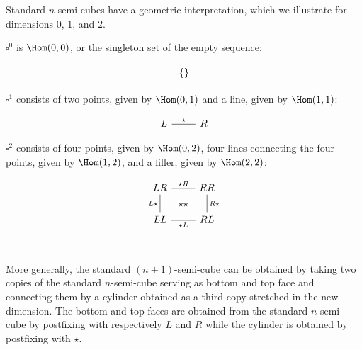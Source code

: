 \documentclass[10pt]{art.cls/art}
\newcommand{\Cube}{\ensuremath{\boldsymbol{\square}}}
\newcommand{\kstar}{{\star}}
\begin{document}
Standard $n$-semi-cubes have a geometric interpretation, which we illustrate for dimensions $0$, $1$, and $2$.

\begin{example}[$\Cube^0$]
  $\Cube^0$ is $\Hom(0, 0)$, or the singleton set of the empty sequence:

  \begin{equation*}
    \begin{tikzcd}
      \{\}
    \end{tikzcd}
  \end{equation*}
\end{example}

\begin{example}[$\Cube^1$]
  $\Cube^1$ consists of two points, given by $\Hom(0, 1)$ and a line, given by $\Hom(1, 1)$:

  \begin{equation*}
    \begin{tikzcd}
      L \arrow[r, "\kstar", dash] & R
    \end{tikzcd}
  \end{equation*}
\end{example}

\begin{example}[$\Cube^2$]
  $\Cube^2$ consists of four points, given by $\Hom(0, 2)$, four lines connecting the four points, given by $\Hom(1, 2)$, and a filler, given by $\Hom(2, 2)$:

  \begin{equation*}
    \begin{tikzcd}
      LR \arrow[r, dash, "\kstar R"{name=F}] \arrow[d, dash, "L\kstar" left] & RR \arrow[d, dash, "R\kstar"] \\
      LL \arrow[r, dash, "\kstar L"{name=T, below}] & RL \\
      \arrow[rightarrow, from=F, to=T, phantom, "\kstar\kstar" description]
    \end{tikzcd}
  \end{equation*}
\end{example}

More generally, the standard $(n+1)$-semi-cube can be obtained by taking two copies of the standard $n$-semi-cube serving as bottom and top face and connecting them by a cylinder obtained as a third copy stretched in the new dimension. The bottom and top faces are obtained from the standard $n$-semi-cube by postfixing with respectively $L$ and $R$ while the cylinder is obtained by postfixing with $\kstar$.
\end{document}
